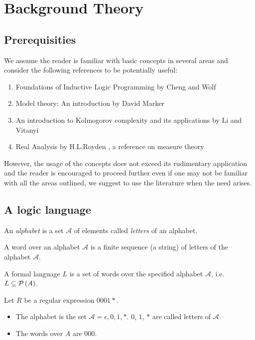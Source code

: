 
\chapter{Background Theory}

\section{Prerequisities}
We assume the reader is familiar with basic concepts in several areas and consider the following references to be potentially useful:
\begin{enumerate}
\item Foundations of Inductive Logic Programming by Cheng and Wolf \cite{cheng1997}
\item Model theory: An introduction by David Marker \cite{marker2002}
\item An introduction to Kolmogorov complexity and its applications by Li and Vitanyi \cite{li1997}
\item Real Analysis by H.L.Royden  \cite{royden1988}, a reference on measure theory
\end{enumerate}
However, the usage of the concepts does not exceed its rudimentary application and the reader is encouraged to proceed further even if one may not be familiar with all the areas outlined, we suggest to use the literature when the need arises.
\section{A logic language}
\begin{defn}
An \emph{alphabet} is a set $\mathcal{A}$ of elements called \emph{letters} of an alphabet.
\end{defn}

\begin{defn}
A word over an alphabet $\mathcal{A}$ is a finite sequence (a string) of letters of the alphabet $\mathcal{A}$.
\end{defn}

\begin{defn}
A formal language $L$ is a set of words over the specified alphabet $\mathcal{A}$, i.e. $L \subseteq \mathcal{P} \left({ A }\right)$.
\end{defn}

\begin{exmp}
Let $R$ be a regular expression $0001*$.
\begin{itemize}
\item The alphabet is the set $\mathcal{A}={\epsilon, 0,1,*}$. $0$, $1$, $*$ are called letters of $\mathcal{A}$.
\item The words over $A$ are $000$.
\end{itemize}
\end{exmp}

